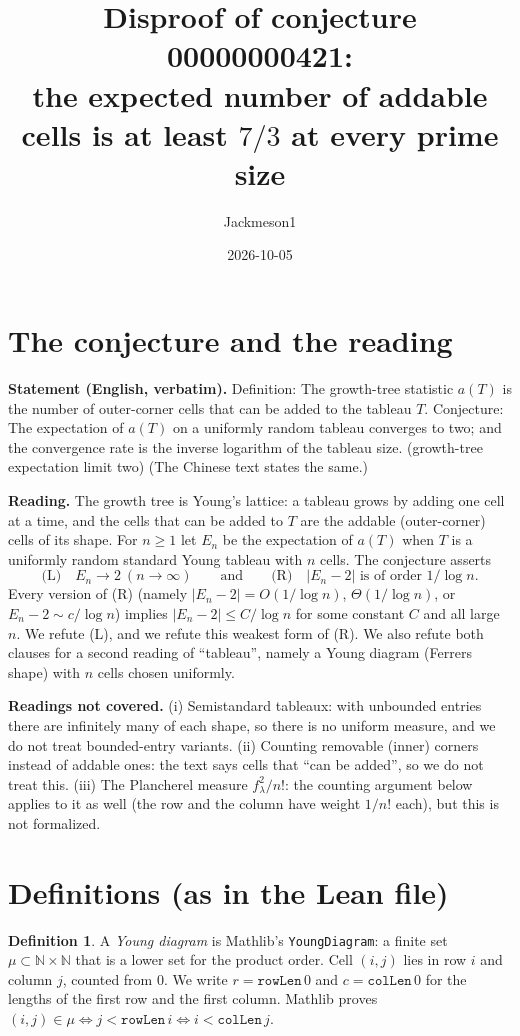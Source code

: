 \documentclass[11pt]{article}
\title{Disproof of conjecture 00000000421:\\ the expected number of addable cells is at least $7/3$ at every prime size}
\author{Jackmeson1}
\date{2026-10-05}
\theoremstyle{definition}
\newtheorem{definition}[theorem]{Definition}
\begin{document}
\maketitle

\section{The conjecture and the reading}

\textbf{Statement (English, verbatim).} Definition: The growth-tree statistic $a(T)$ is the number
of outer-corner cells that can be added to the tableau $T$. Conjecture: The expectation of $a(T)$
on a uniformly random tableau converges to two; and the convergence rate is the inverse logarithm
of the tableau size. (growth-tree expectation limit two) (The Chinese text states the same.)

\textbf{Reading.} The growth tree is Young's lattice: a tableau grows by adding one cell at a time,
and the cells that can be added to $T$ are the addable (outer-corner) cells of its shape. For
$n\ge 1$ let $E_n$ be the expectation of $a(T)$ when $T$ is a uniformly random standard Young
tableau with $n$ cells. The conjecture asserts
\[
  \text{(L)}\quad E_n \to 2 \ (n\to\infty)
  \qquad\text{and}\qquad
  \text{(R)}\quad |E_n-2| \text{ is of order } 1/\log n .
\]
Every version of (R) (namely $|E_n-2|=O(1/\log n)$, $\Theta(1/\log n)$, or $E_n-2\sim c/\log n$)
implies $|E_n-2|\le C/\log n$ for some constant $C$ and all large $n$. We refute (L), and we refute
this weakest form of (R). We also refute both clauses for a second reading of ``tableau'', namely a
Young diagram (Ferrers shape) with $n$ cells chosen uniformly.

\textbf{Readings not covered.} (i) Semistandard tableaux: with unbounded entries there are infinitely
many of each shape, so there is no uniform measure, and we do not treat bounded-entry variants.
(ii) Counting removable (inner) corners instead of addable ones: the text says cells that ``can be
added'', so we do not treat this. (iii) The Plancherel measure $f_\lambda^2/n!$: the counting
argument below applies to it as well (the row and the column have weight $1/n!$ each), but this is
not formalized.

\section{Definitions (as in the Lean file)}

\begin{definition}
A \emph{Young diagram} is Mathlib's \texttt{YoungDiagram}: a finite set $\mu\subset\mathbb N\times\mathbb N$
that is a lower set for the product order. Cell $(i,j)$ lies in row $i$ and column $j$, counted from
$0$. We write $r=\mathtt{rowLen}\,0$ and $c=\mathtt{colLen}\,0$ for the lengths of the first row and the
first column. Mathlib proves $(i,j)\in\mu \iff j<\mathtt{rowLen}\,i \iff i<\mathtt{colLen}\,j$.
\end{definition}
\end{document}
